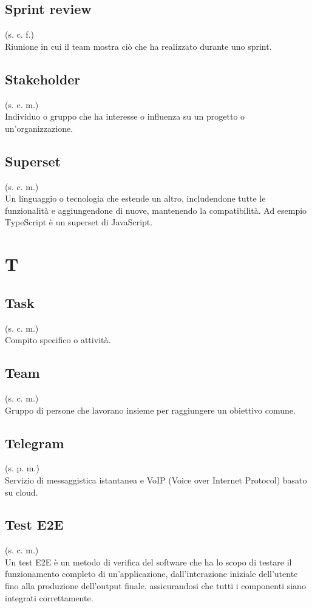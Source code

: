 \subsection{Sprint review}
(s. c. f.)\\
Riunione in cui il team mostra ciò che ha realizzato durante uno sprint.
\subsection{Stakeholder}
(s. c. m.)\\
Individuo o gruppo che ha interesse o influenza su un progetto o un'organizzazione.
\subsection{Superset}
(s. c. m.)\\
Un linguaggio o tecnologia che estende un altro, includendone tutte le funzionalità e
aggiungendone di nuove, mantenendo la compatibilità. Ad esempio TypeScript è un superset di JavaScript.
\pagebreak
\section{T}
\subsection{Task}
(s. c. m.)\\
Compito specifico o attività.
\subsection{Team}
(s. c. m.)\\
\label{Team}
Gruppo di persone che lavorano insieme per raggiungere un obiettivo comune.
\subsection{Telegram}
(s. p. m.)\\
Servizio di messaggistica istantanea e VoIP (Voice over Internet Protocol)
basato su cloud.
\subsection{Test E2E}
(s. c. m.)\\
Un test E2E è un metodo di verifica del software che ha lo scopo di testare il funzionamento completo di un'applicazione,
dall'interazione iniziale dell'utente fino alla produzione dell'output finale, assicurandosi che tutti i componenti siano integrati correttamente.
